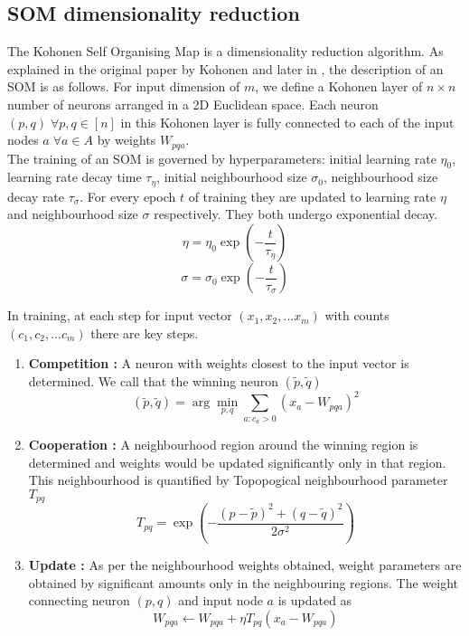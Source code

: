 \documentclass[a4paper,10pt]{article}
\begin{document}
\subsection{SOM dimensionality reduction}

The Kohonen Self Organising Map is a dimensionality reduction algorithm. As explained in the original paper by Kohonen \cite{kohonen1991self} and later in \cite{kohonen1997exploration}, the description of an SOM is as follows. For input dimension of $m$, we define a Kohonen layer of $n \times n$ number of neurons arranged in a 2D Euclidean space. Each neuron $(p,q)\; \forall p,q \in [n]$ in this Kohonen layer is fully connected to each of the input nodes $a \; \forall a \in A$ by weights $W_{pqa}$.
\\

\noindent The training of an SOM is governed by hyperparameters: initial learning rate $\eta_0$, learning rate decay time $\tau_\eta$, initial neighbourhood size $\sigma_0$, neighbourhood size decay rate $\tau_\sigma$. For every epoch $t$ of training they are updated to learning rate $\eta$ and neighbourhood size $\sigma$ respectively. They both undergo exponential decay.
$$\eta = \eta_0 \exp\left(-\frac{t}{\tau_\eta}\right)$$
$$\sigma = \sigma_0 \exp\left(-\frac{t}{\tau_\sigma}\right)$$

\noindent In training, at each step for input vector $(x_1, x_2, ... x_m)$ with counts $(c_1, c_2, ... c_m)$ there are key steps.
\begin{enumerate}
	\item \textbf{Competition :} A neuron with weights closest to the input vector is determined. We call that the winning neuron $(\tilde{p}, \tilde{q})$
	$$(\tilde{p}, \tilde{q}) = \arg\min_{p,q} \sum_{a:c_a>0} (x_a - W_{pqa})^2$$
	\item \textbf{Cooperation :} A neighbourhood region around the winning region is determined and weights would be updated significantly only in that region. This neighbourhood is quantified by Topopogical neighbourhood parameter $T_{pq}$
	$$T_{pq} = \exp(-\frac{(p-\tilde{p})^2 + (q-\tilde{q})^2}{2\sigma^2})$$
	\item \textbf{Update :} As per the neighbourhood weights obtained, weight parameters are obtained by significant amounts only in the neighbouring regions. The weight connecting neuron $(p,q)$ and input node $a$ is updated as
	$$W_{pqa} \leftarrow W_{pqa} + \eta  T_{pq}  (x_a - W_{pqa})$$
\end{enumerate}
\end{document}
